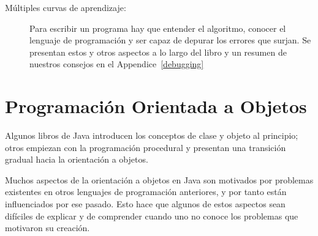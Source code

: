 \begin{description}
\item[Múltiples curvas de aprendizaje:]
Para escribir un programa hay que entender el algoritmo, conocer el lenguaje de programación y ser capaz de depurar los errores que surjan.
Se presentan estos y otros aspectos a lo largo del libro y un resumen de nuestros consejos en el Appendice~\ref{debugging}



\end{description}

\section*{Programación Orientada a Objetos}

Algunos libros de Java introducen los conceptos de clase y objeto al principio; otros empiezan con la programación procedural y presentan una transición gradual hacia la orientación a objetos.

Muchos aspectos de la orientación a objetos en Java son motivados por problemas existentes en otros lenguajes de programación anteriores, y por tanto están influenciados por ese pasado.
Esto hace que algunos de estos aspectos sean difíciles de explicar y de comprender cuando uno no conoce los problemas que motivaron su creación.

